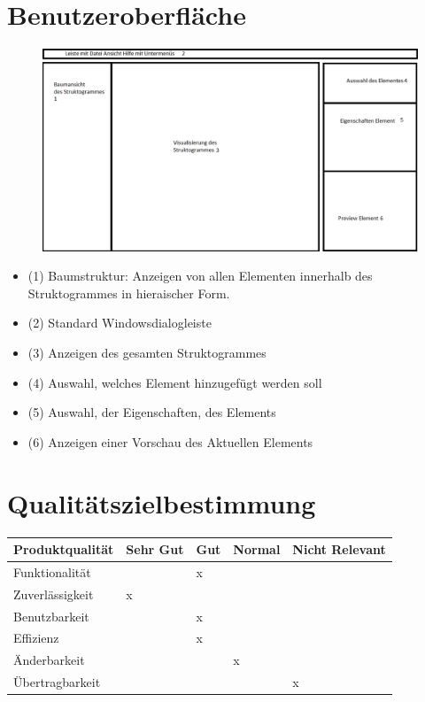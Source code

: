 \documentclass[a4paper,10pt]{report}
\begin{document}
\section{Benutzeroberfläche}
\begin{figure}[h!]
  \centering
    \includegraphics[width=1.3\textwidth]{gui-skizze.png}
\end{figure}
\begin{itemize}

\item (1) Baumstruktur: Anzeigen von allen Elementen innerhalb des Struktogrammes in hieraischer Form.
\item (2) Standard Windowsdialogleiste
\item (3) Anzeigen des gesamten Struktogrammes
\item (4) Auswahl, welches Element hinzugefügt werden soll
\item (5) Auswahl, der Eigenschaften, des Elements
\item (6) Anzeigen einer Vorschau des Aktuellen Elements

\end{itemize}
\section{Qualitätszielbestimmung}

\begin{center}
  \begin{tabular}{| l | l | l | l | l |}
    \hline
   	 Produktqualität & Sehr Gut & Gut  & Normal & Nicht Relevant \\ \hline
    	 Funktionalität &   &  x &  & \\ \hline
 	 Zuverlässigkeit & x  &   &  & \\ \hline
 	Benutzbarkeit &   &  x &  & \\ \hline
      	 Effizienz &   &  x &  & \\ \hline
      	 Änderbarkeit &   &  &  x & \\ \hline
      	Übertragbarkeit &   &   &  & x \\ \hline
  \end{tabular}
\end{center}
\end{document}
